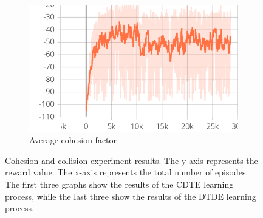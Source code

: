\documentclass[12pt,a4paper,openright,twoside]{book}
\begin{document}
\begin{figure}[t]
\begin{subfigure}[b]{0.32\textwidth}
            \includegraphics[width=\textwidth]{figures/cohesion-dtde.pdf}
            \caption{Average cohesion factor}
            \label{fig:cohesion-dcc}
        \end{subfigure}
    \caption{Cohesion and collision experiment results. The y-axis represents the reward value.
    The x-axis represents the total number of episodes.
    The first three graphs show the results of the CDTE learning process, while the last three show the results of the DTDE learning process.}
    \label{fig:cc-results}
    \end{figure}
    
\end{document}
